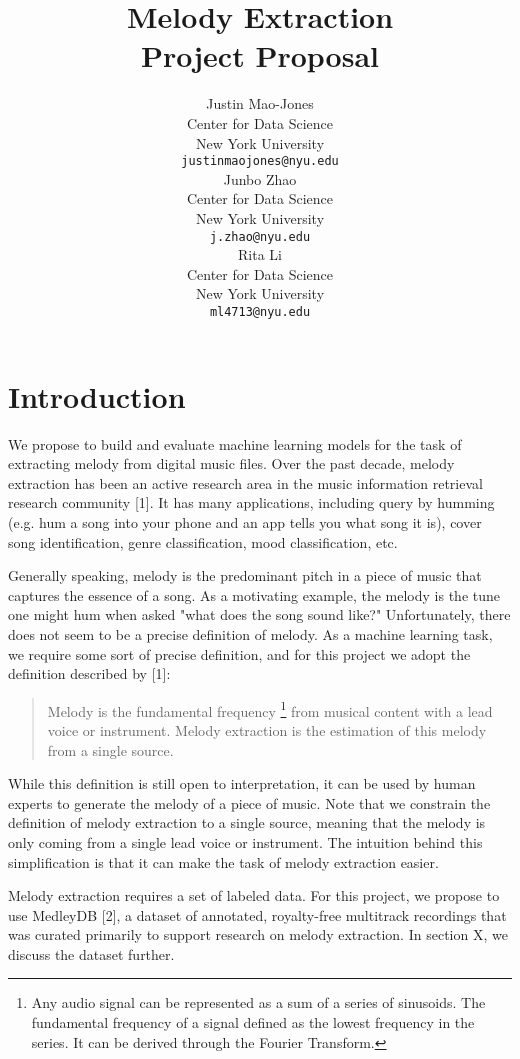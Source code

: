 \documentclass{article} %
\title{Melody Extraction \\ Project Proposal}
\author{
Justin Mao-Jones \\
Center for Data Science\\
New York University\\
\texttt{justinmaojones@nyu.edu} \\
\And
Junbo Zhao \\
Center for Data Science\\
New York University\\
\texttt{j.zhao@nyu.edu} \\
\AND
Rita Li \\
Center for Data Science\\
New York University\\
\texttt{ml4713@nyu.edu} \\
}
\begin{document}
\maketitle

\section{Introduction}

We propose to build and evaluate machine learning models for the task of extracting melody from digital music files.  Over the past decade, melody extraction has been an active research area in the music information retrieval research community [1].  It has many applications, including query by humming (e.g. hum a song into your phone and an app tells you what song it is), cover song identification, genre classification, mood classification, etc.

Generally speaking, melody is the predominant pitch in a piece of music that captures the essence of a song.  As a motivating example, the melody is the tune one might hum when asked "what does the song sound like?"  Unfortunately, there does not seem to be a precise definition of melody.  As a machine learning task, we require some sort of precise definition, and for this project we adopt the definition described by [1]:

\begin{quote}
Melody is the fundamental frequency \footnote{Any audio signal can be represented as a sum of a series of sinusoids.  The fundamental frequency of a signal defined as the lowest frequency in the series.  It can be derived through the Fourier Transform.} from musical content with a lead voice or instrument.  Melody extraction is the estimation of this melody from a single source.
\end{quote}

While this definition is still open to interpretation, it can be used by human experts to generate the melody of a piece of music.  Note that we constrain the definition of melody extraction to a single source, meaning that the melody is only coming from a single lead voice or instrument.  The intuition behind this simplification is that it can make the task of melody extraction easier.

Melody extraction requires a set of labeled data.  For this project, we propose to use MedleyDB [2], a dataset of annotated, royalty-free multitrack recordings that was curated primarily to support research on melody extraction.  In section X, we discuss the dataset further.
\end{document}
